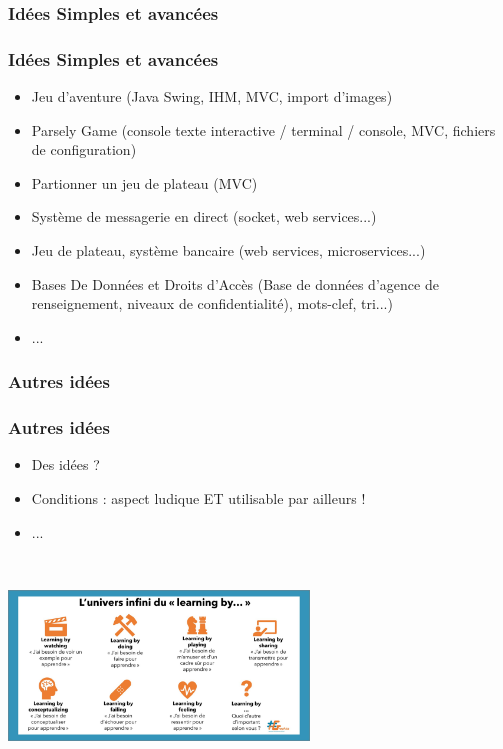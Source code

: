 \documentclass[slidetop,11pt]{beamer}
\begin{document}
\subsubsection{Id{\'e}es Simples et avanc{\'e}es}
\begin{frame}
	\frametitle{Id{\'e}es Simples et avanc{\'e}es}
	\begin{itemize}
		\item Jeu d'aventure (Java Swing, IHM, MVC, import d'images)
		\item Parsely Game (console texte interactive / terminal / console, MVC, fichiers de configuration)
		\item Partionner un jeu de plateau (MVC)
		\item Syst{\`e}me de messagerie en direct (socket, web services...)
		\item Jeu de plateau, syst{\`e}me bancaire (web services, microservices...)
		\item Bases De Donn{\'e}es et Droits d'Acc{\`e}s (Base de donn{\'e}es d'agence de renseignement, niveaux de confidentialit{\'e}), mots-clef, tri...)
		\item ... 
	\end{itemize}
\end{frame} 

\subsubsection{Autres id{\'e}es}
\begin{frame}
	\frametitle{Autres id{\'e}es}
	\begin{itemize}
		\item Des id{\'e}es ?
		\item Conditions : aspect ludique ET utilisable par ailleurs !
		\item ...
	\end{itemize}~\\
	
	\begin{center} \includegraphics[width=8.0cm]{img/1626087344286.jpeg} \end{center}~\\
	
\end{frame} 
\end{document}
